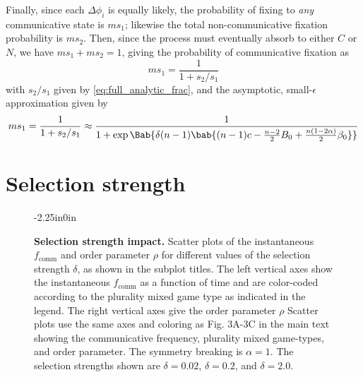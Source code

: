 \documentclass[10pt,letterpaper]{article}
\begin{document}
Finally, since each $\Delta \phi_i$ is equally likely,
the probability of fixing to \emph{any}
communicative state is $m s_1$;
likewise the total non-communicative fixation probability is $m s_2$.
Then, since the process must eventually absorb to either $C$ or $N$,
we have
$m s_1 + m s_2 = 1$, giving the probability of communicative fixation as
\begin{equation}
  m s_1 = \frac{1}{1 + s_2/s_1}
  \label{eq:full_analytic}
\end{equation}
with $s_2/s_1$ given by \cref{eq:full_analytic_frac},
and the asymptotic, small-$\epsilon$ approximation given by
\begin{equation}
  m s_1 = \frac{1}{1 + s_2/s_1}
  \approx
  \frac{1}
  {1 + \exp \Bab{\delta (n-1) \bab{
    (n-1) c
    - \frac{n-2}{2} B_0
    +
    \frac{n (1 - 2 \alpha)}{2} \beta_0
    }}
  }
  \label{eq:analytic_first_term}
\end{equation}

\section{Selection strength}
\begin{figure}
\begin{adjustwidth}{-2.25in}{0in}
  \centering
  \begin{subcaptiongroup}
      {\label{fig:selection_strength-2}\captiontext*{}}{%
      {\label{fig:selection_strength-02}\captiontext*{}}{%
      {\label{fig:selection_strength-002}\captiontext*{}}{%
		{}%
  }}}
  \end{subcaptiongroup}
  \caption{
    \textbf{
			Selection strength impact.
    }
    Scatter plots of the instantaneous $f_{\text{comm}}$
		and order parameter $\rho$ for different values of the selection
		strength $\delta$, as shown in the subplot titles.
    The left vertical axes show the instantaneous $f_{\text{comm}}$
    as a function of time and are color-coded according
    to the plurality mixed game type as indicated in the legend.
    The right vertical axes give the order parameter $\rho$
    Scatter plots use the same axes and coloring as Fig. 3A-3C in the main text
    showing the communicative frequency, plurality mixed game-types, and order parameter.
		The symmetry breaking is $\alpha = 1$.
		The selection strengths shown are
		$\delta = 0.02$,
		$\delta = 0.2$,
		and
		$\delta = 2.0$.
  }\label{fig:selection-strength}
\end{adjustwidth}
\end{figure}
\end{document}
